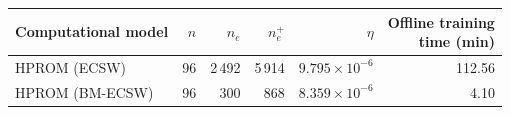 \begin{tabular}{@{}lrrrrr@{}}
\toprule
Computational model & $n$ & $n_e$ & $n_e^+$ & $\eta$ & \shortstack{Offline training\\time (min)}\\
\midrule
HPROM (ECSW) & 96 & 2\,492 & 5\,914 & $9.795\times10^{-6}$ & 112.56\\
HPROM (BM-ECSW) & 96 & 300 & 868 & $8.359\times10^{-6}$ & 4.10\\
\bottomrule
\end{tabular}
